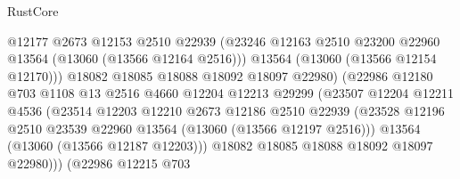 \begin{lexlean}{RustCore}
\begin{coremodule}
                                    @12177
                                    @2673
                                    @12153
                                    @2510
                                    @22939
                                    (@23246
                                      @12163
                                      @2510
                                      @23200
                                      @22960
                                      @13564
                                      (@13060 (@13566 @12164 @2516)))
                                    @13564
                                    (@13060 (@13566 @12154 @12170)))
                                  @18082
                                  @18085
                                  @18088
                                  @18092
                                  @18097
                                  @22980)
                                (@22986
                                  @12180
                                  @703
                                  @1108
                                  @13
                                  @2516
                                  @4660
                                  @12204
                                  @12213
                                  @29299
                                  (@23507
                                    @12204
                                    @12211
                                    @4536
                                    (@23514
                                      @12203
                                      @12210
                                      @2673
                                      @12186
                                      @2510
                                      @22939
                                      (@23528
                                        @12196
                                        @2510
                                        @23539
                                        @22960
                                        @13564
                                        (@13060 (@13566 @12197 @2516)))
                                      @13564
                                      (@13060 (@13566 @12187 @12203)))
                                    @18082
                                    @18085
                                    @18088
                                    @18092
                                    @18097
                                    @22980)))
                              (@22986
                                @12215
                                @703

\end{coremodule}
\end{lexlean}
